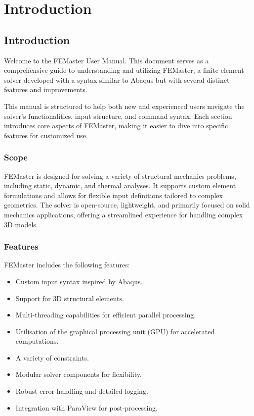 
\chapter{Introduction}

\section{Introduction}
Welcome to the FEMaster User Manual. This document serves as a comprehensive guide to understanding and utilizing FEMaster, a finite element solver developed with a syntax similar to Abaqus but with several distinct features and improvements.

This manual is structured to help both new and experienced users navigate the solver’s functionalities, input structure, and command syntax. Each section introduces core aspects of FEMaster, making it easier to dive into specific features for customized use.

\subsection{Scope}
FEMaster is designed for solving a variety of structural mechanics problems, including static, dynamic, and thermal analyses. It supports custom element formulations and allows for flexible input definitions tailored to complex geometries. The solver is open-source, lightweight, and primarily focused on solid mechanics applications, offering a streamlined experience for handling complex 3D models.

\subsection{Features}
FEMaster includes the following features:
\begin{itemize}
    \item Custom input syntax inspired by Abaqus.
    \item Support for 3D structural elements.
    \item Multi-threading capabilities for efficient parallel processing.
    \item Utilisation of the graphical processing unit (GPU) for accelerated computations.
    \item A variety of constraints.
    \item Modular solver components for flexibility.
    \item Robust error handling and detailed logging.
    \item Integration with ParaView for post-processing.
\end{itemize}


